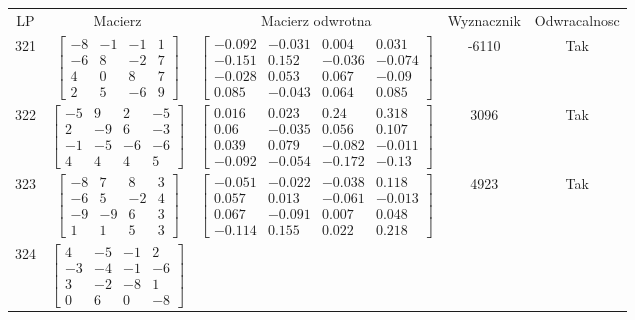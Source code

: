\documentclass[a4paper,12pt]{article}
\begin{document}
\bgroup {} \vspace{0.2in} \begin{tabular}{c c c c c}
LP & Macierz & Macierz odwrotna & Wyznacznik & Odwracalnosc\\
321
&
$\begin{bmatrix} -8 & -1 & -1 & 1 \\ -6 & 8 & -2 & 7 \\ 4 & 0 & 8 & 7 \\ 2 & 5 & -6 & 9 \end{bmatrix}$
&
$\begin{bmatrix} -0.092 & -0.031 & 0.004 & 0.031 \\ -0.151 & 0.152 & -0.036 & -0.074 \\ -0.028 & 0.053 & 0.067 & -0.09 \\ 0.085 & -0.043 & 0.064 & 0.085 \end{bmatrix}$
&
-6110
&
Tak
\\
322
&
$\begin{bmatrix} -5 & 9 & 2 & -5 \\ 2 & -9 & 6 & -3 \\ -1 & -5 & -6 & -6 \\ 4 & 4 & 4 & 5 \end{bmatrix}$
&
$\begin{bmatrix} 0.016 & 0.023 & 0.24 & 0.318 \\ 0.06 & -0.035 & 0.056 & 0.107 \\ 0.039 & 0.079 & -0.082 & -0.011 \\ -0.092 & -0.054 & -0.172 & -0.13 \end{bmatrix}$
&
3096
&
Tak
\\
323
&
$\begin{bmatrix} -8 & 7 & 8 & 3 \\ -6 & 5 & -2 & 4 \\ -9 & -9 & 6 & 3 \\ 1 & 1 & 5 & 3 \end{bmatrix}$
&
$\begin{bmatrix} -0.051 & -0.022 & -0.038 & 0.118 \\ 0.057 & 0.013 & -0.061 & -0.013 \\ 0.067 & -0.091 & 0.007 & 0.048 \\ -0.114 & 0.155 & 0.022 & 0.218 \end{bmatrix}$
&
4923
&
Tak
\\
324
&
$\begin{bmatrix} 4 & -5 & -1 & 2 \\ -3 & -4 & -1 & -6 \\ 3 & -2 & -8 & 1 \\ 0 & 6 & 0 & -8 \end{bmatrix}$

\end{tabular}
\end{document}
